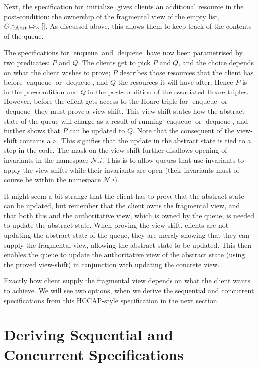 \documentclass[a4paper, 10pt]{report}
\theoremstyle{definition}
\newcommand{\initialise}{\operatorname{initialize}}
\newcommand{\enqueue}{\operatorname{enqueue}}
\newcommand{\dequeue}{\operatorname{dequeue}}
\newcommand{\Qg}{G}
\newcommand{\gabst}{\gname_{\mathrm{Abst}}}
\newcommand{\Nl}{\ensuremath{\mathcal{N}}}
\newcommand{\abstractstatefullfrag}[2]{#1 \Mapsto_{\circ} #2}
\begin{document}
Next, the specification for $\initialise$ gives clients an additional resource in the post-condition: the ownership of the fragmental view of the empty list, $\abstractstatefullfrag{\Qg.\gabst}{[]}$. As discussed above, this allows them to keep track of the contents of the queue.

The specifications for $\enqueue$ and $\dequeue$ have now been parametrised by two predicates: $P$ and $Q$. The clients get to pick $P$ and $Q$, and the choice depends on what the client wishes to prove; $P$ describes those resources that the client has before $\enqueue$ or $\dequeue$, and $Q$ the resources it will have after. Hence $P$ is in the pre-condition and $Q$ in the post-condition of the associated Hoare triples. However, before the client gets access to the Hoare triple for $\enqueue$ or $\dequeue$ they must prove a view-shift. This view-shift states how the abstract state of the queue will change as a result of running $\enqueue$ or $\dequeue$, and further shows that $P$ can be updated to $Q$. Note that the consequent of the view-shift contains a $\mathop{\triangleright}$. This signifies that the update in the abstract state is tied to a step in the code. The mask on the view-shift further disallows opening of invariants in the namespace $\Nl.i$. This is to allow queues that use invariants to apply the view-shifts while their invariants are open (their invariants must of course be within the namespace $\Nl.i$).

It might seem a bit strange that the client has to prove that the abstract state can be updated, but remember that the client owns the fragmental view, and that both this and the authoritative view, which is owned by the queue, is needed to update the abstract state. When proving the view-shift, clients are not updating the abstract state of the queue, they are merely showing that they can supply the fragmental view, allowing the abstract state to be updated. This then enables the queue to update the authoritative view of the abstract state (using the proved view-shift) in conjunction with updating the concrete view.

Exactly how client supply the fragmental view depends on what the client wants to achieve. We will see two options, when we derive the sequential and concurrent specifications from this HOCAP-style specification in the next section.

\section{Deriving Sequential and Concurrent Specifications}
\label{QueueSpecs:section:deriving-seq-and-conc}
\end{document}
